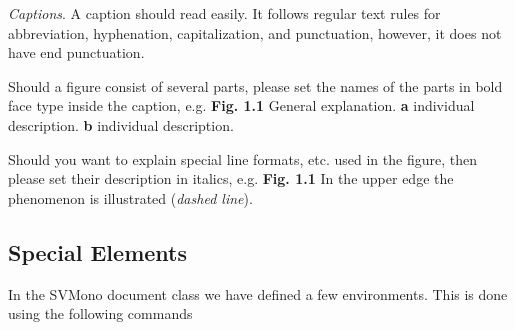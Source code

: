 \documentclass[graybox]{svmono}
\begin{document}
\emph{Captions}. A caption should read easily. It follows regular text rules for abbreviation, hyphenation, capitalization, and punctuation, however, it does not have end punctuation.

Should a figure consist of several parts, please set the names of the parts in bold face type inside the caption, e.g. \textbf{Fig. 1.1} General explanation. \textbf{a} individual description. \textbf{b} individual description.

Should you want to explain special line formats, etc. used in the figure, then please set their description in italics, e.g. \textbf{Fig. 1.1} In the upper edge the phenomenon is illustrated (\textit{dashed line}).


\enlargethispage{12pt}

\subsection{Special Elements}

In the {\sc SVMono} document class we have defined a few environments. This is done using the following commands

\cprotect{}
\end{document}
